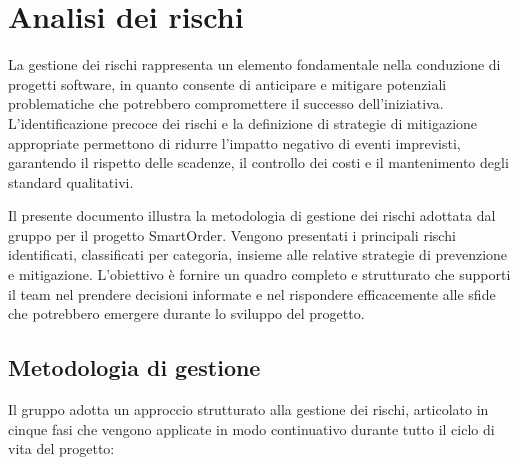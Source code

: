 \documentclass[a4paper, 11pt, oneside]{scrartcl} %
\begin{document}
\newpage
\section{Analisi dei rischi}
\label{sec:analisi_rischi}
La gestione dei rischi rappresenta un elemento fondamentale nella conduzione di progetti software, in quanto consente di anticipare e mitigare potenziali problematiche che potrebbero compromettere il successo dell'iniziativa. L'identificazione precoce dei rischi e la definizione di strategie di mitigazione appropriate permettono di ridurre l'impatto negativo di eventi imprevisti, garantendo il rispetto delle scadenze, il controllo dei costi e il mantenimento degli standard qualitativi.

Il presente documento illustra la metodologia di gestione dei rischi adottata dal gruppo per il progetto SmartOrder. Vengono presentati i principali rischi identificati, classificati per categoria, insieme alle relative strategie di prevenzione e mitigazione. L'obiettivo è fornire un quadro completo e strutturato che supporti il team nel prendere decisioni informate e nel rispondere efficacemente alle sfide che potrebbero emergere durante lo sviluppo del progetto.

\subsection{Metodologia di gestione}

Il gruppo adotta un approccio strutturato alla gestione dei rischi, articolato in cinque fasi che vengono applicate in modo continuativo durante tutto il ciclo di vita del progetto:
\end{document}
